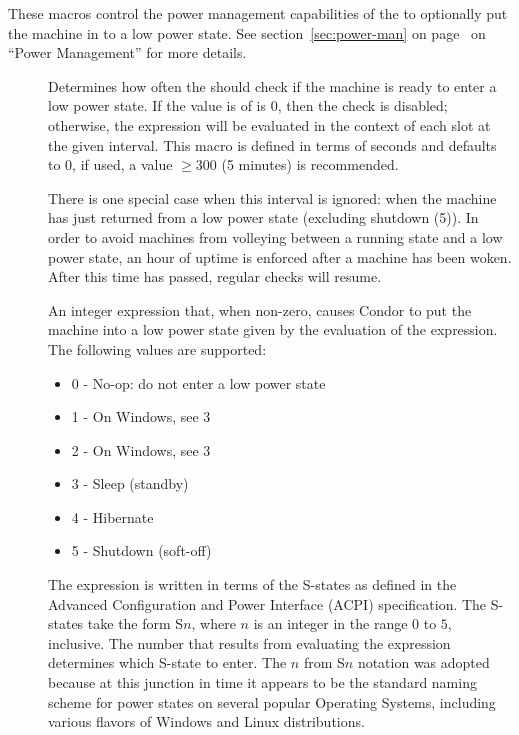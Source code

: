 These macros control the power management capabilities of the 
 to optionally put the machine in to a low power state.
See section~\ref{sec:power-man} on page~\pageref{sec:power-man} on
``Power Management'' for more details.

\begin{description}

\item[]
\label{param:HibernateCheckInterval}
  Determines how often the  should check if the 
  machine is ready to enter a low power state.  If the value is 
  of  is 0, then the check is 
  disabled; otherwise, the  expression will be 
  evaluated in the context of each slot at the given interval.  
  This macro is defined in terms of seconds and defaults to 0,
  if used, a value $\ge300$ (5 minutes) is recommended.

  There is one special case when this interval is ignored: when the 
  machine has just returned from a low power state (excluding 
  shutdown (5)).  In order to avoid machines from volleying between 
  a running state and a low power state, an hour of uptime is enforced
  after a machine has been woken.  After this time has passed, regular
  checks will resume.

\item[]
\label{param:Hibernate}
  An integer expression that, when non-zero, causes Condor to put the 
  machine into a low power state given by the evaluation of the 
  expression.  The following values are supported:

  \begin{itemize}
  \item[] 0 - No-op: do not enter a low power state
  \item[] 1 - On Windows, see 3
  \item[] 2 - On Windows, see 3
  \item[] 3 - Sleep (standby)
  \item[] 4 - Hibernate
  \item[] 5 - Shutdown (soft-off)
  \end{itemize}
  
  The  expression is written in terms of the S-states
  as defined in the Advanced Configuration and Power Interface 
  (ACPI) specification.  The S-states take the form S$n$, where $n$ is 
  an integer in the range $0$ to $5$, inclusive.  The number that results 
  from evaluating the expression determines which S-state to enter. The 
  $n$ from S$n$ notation was adopted because at this junction in time 
  it appears to be the standard naming scheme for power states on several
  popular Operating Systems, including various flavors of Windows and Linux
  distributions.


\end{description}
